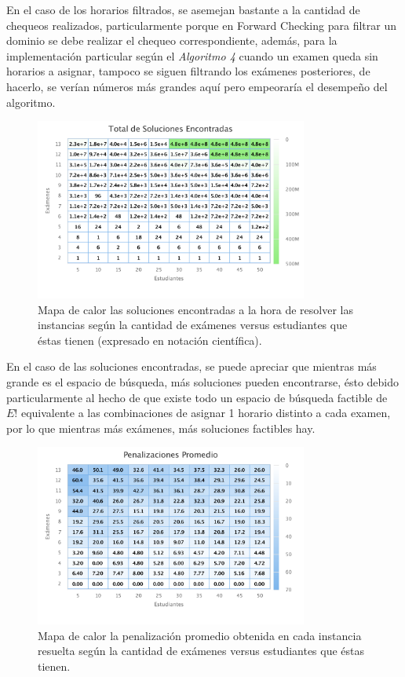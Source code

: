 \documentclass[letter, 10pt]{article}
\begin{document}
En el caso de los horarios filtrados, se asemejan bastante a la cantidad de chequeos realizados, particularmente porque en Forward Checking para filtrar un dominio se debe realizar el chequeo correspondiente, además, para la implementación particular según el \textit{Algoritmo 4} cuando un examen queda sin horarios a asignar, tampoco se siguen filtrando los exámenes posteriores, de hacerlo, se verían números más grandes aquí pero empeoraría el desempeño del algoritmo.

\begin{figure}[H]
\begin{center}
\includegraphics[width=0.8\textwidth]{img/g5.pdf}
\end{center}
\caption{Mapa de calor las soluciones encontradas a la hora de resolver las instancias según la cantidad de exámenes versus estudiantes que éstas tienen (expresado en notación científica).}
\label{fig:g5}
\end{figure}

En el caso de las soluciones encontradas, se puede apreciar que mientras más grande es el espacio de búsqueda, más soluciones pueden encontrarse, ésto debido particularmente al hecho de que existe todo un espacio de búsqueda factible de $E!$ equivalente a las combinaciones de asignar 1 horario distinto a cada examen, por lo que mientras más exámenes, más soluciones factibles hay.

\begin{figure}[H]
\begin{center}
\includegraphics[width=0.8\textwidth]{img/g6.pdf}
\end{center}
\caption{Mapa de calor la penalización promedio obtenida en cada instancia resuelta según la cantidad de exámenes versus estudiantes que éstas tienen.}
\label{fig:g6}
\end{figure}
\end{document}
